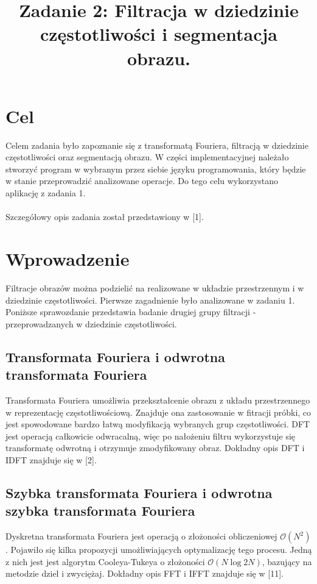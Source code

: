 \documentclass{classrep}
\author{
  \studentinfo{Jakub Antosik}{206788} \and
  \studentinfo{Andrzej Lisowski}{206807} 
}
\title{Zadanie 2: Filtracja w dziedzinie częstotliwości i segmentacja obrazu.}
\begin{document}
\maketitle

\section{Cel}
Celem zadania było zapoznanie się z transformatą Fouriera, filtracją w dziedzinie częstotliwości oraz segmentacją obrazu. W części implementacyjnej należało stworzyć program w wybranym przez siebie języku programowania, który będzie w stanie przeprowadzić analizowane operacje. Do tego celu wykorzystano aplikację z zadania 1.\\
\\
\indent
Szczegółowy opis zadania został przedstawiony w [1].

\section{Wprowadzenie}
Filtracje obrazów można podzielić na realizowane w układzie przestrzennym i w dziedzinie częstotliwości. Pierwsze zagadnienie było analizowane w zadaniu 1. Poniższe sprawozdanie przedstawia badanie drugiej grupy filtracji - przeprowadzanych w dziedzinie częstotliwości.  

\subsection{Transformata Fouriera i odwrotna transformata Fouriera}
Transformata Fouriera umożliwia przekształcenie obrazu z układu przestrzennego w reprezentację częstotliwościową. Znajduje ona zastosowanie w fitracji próbki, co jest spowodowane bardzo łatwą modyfikacją wybranych grup częstotliwości. DFT jest operacją całkowicie odwracalną, więc po nałożeniu filtru wykorzystuje się transformatę odwrotną i otrzymuje zmodyfikowany obraz. Dokładny opis DFT i IDFT znajduje się w [2].

\subsection{Szybka transformata Fouriera i odwrotna szybka transformata Fouriera}
Dyskretna transformata Fouriera jest operacją o złożoności obliczeniowej $\mathcal{O}(N^{2})$. Pojawiło się kilka propozycji umożliwiających optymalizację tego procesu. Jedną z nich jest jest algorytm Cooleya-Tukeya o złożoności $\mathcal{O}(N\log{2}N)$, bazujący na metodzie dziel i zwyciężaj. Dokładny opis FFT i IFFT znajduje się w [11].
\end{document}
